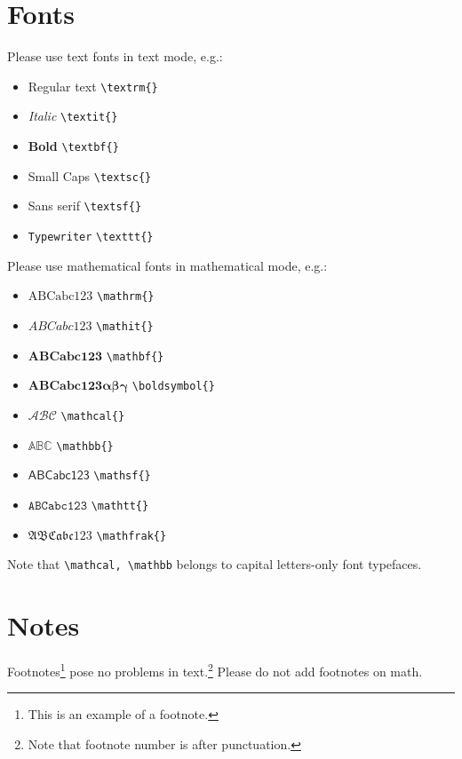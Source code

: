 \documentclass[qe,nameyear,final,supplement,openaccess]{econsocart}
\theoremstyle{plain}
\begin{document}
\section{Fonts}

Please use text fonts in text mode, e.g.:

\begin{itemize}
\item Regular text \texttt{{\textbackslash}textrm\{\}}
\item \textit{Italic} \texttt{{\textbackslash}textit\{\}}
\item \textbf{Bold} \texttt{{\textbackslash}textbf\{\}}
\item Small Caps \texttt{{\textbackslash}textsc\{\}}
\item Sans serif \texttt{{\textbackslash}textsf\{\}}
\item \texttt{Typewriter} \texttt{{\textbackslash}texttt\{\}}
\end{itemize}

Please use mathematical fonts in mathematical mode, e.g.:

\begin{itemize}
\item $\mathrm{ABCabc123}$ \texttt{{\textbackslash}mathrm\{\}}
\item $\mathit{ABCabc123}$ \texttt{{\textbackslash}mathit\{\}}
\item $\mathbf{ABCabc123}$ \texttt{{\textbackslash}mathbf\{\}}
\item $\boldsymbol{ABCabc123\alpha\beta\gamma}$ \texttt{{\textbackslash}boldsymbol\{\}}
\item $\mathcal{ABC}$ \texttt{{\textbackslash}mathcal\{\}}
\item $\mathbb{ABC}$ \texttt{{\textbackslash}mathbb\{\}}
\item $\mathsf{ABCabc123}$ \texttt{{\textbackslash}mathsf\{\}}
\item $\mathtt{ABCabc123}$ \texttt{{\textbackslash}mathtt\{\}}
\item $\mathfrak{ABCabc123}$ \texttt{{\textbackslash}mathfrak\{\}}
\end{itemize}

Note that \texttt{{\textbackslash}mathcal, {\textbackslash}mathbb} belongs to capital letters-only font typefaces.

\section{Notes}

Footnotes\footnote{This is an example of a footnote.}
pose no problems in text.\footnote{Note that footnote number is after punctuation.} Please do not add footnotes on math.
\end{document}
